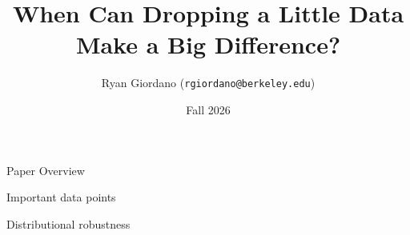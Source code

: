 \documentclass[10pt]{beamer}
\title{When Can Dropping a Little Data Make a Big Difference?}
\author{Ryan Giordano (\texttt{rgiordano@berkeley.edu})}
\date{Fall 2026}
\begin{document}



\begin{frame}[plain]
  \vfill
  \begin{block}{}
    \centering
    \Huge Paper Overview
  \end{block}
  \vfill
\end{frame}






\begin{frame}[plain]
  \vfill
  \begin{block}{}
    \centering
    \Huge Important data points
  \end{block}
  \vfill
\end{frame}




\begin{frame}[plain]
  \vfill
  \begin{block}{}
    \centering
    \Huge Distributional robustness
  \end{block}
  \vfill
\end{frame}







\end{document}
